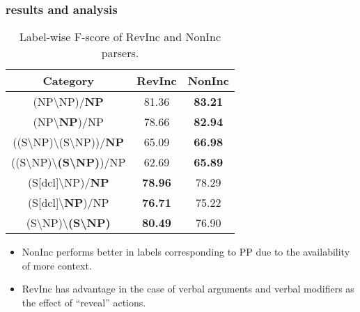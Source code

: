 \documentclass[10pt,usepdftitle=false,hyperref={unicode}]{beamer}
\begin{document}
\begin{frame}
    \frametitle{results and analysis}
    \begingroup
    \small
    \begin{center}
    \begin{table}
        \caption{Label-wise F-score of RevInc and NonInc parsers.}
            \begin{tabular}{ccc}
            \toprule
            Category                                                               & RevInc         & NonInc         \\
            \midrule
            (NP{\textbackslash}NP)/\textbf{NP}                                     & 81.36          & \textbf{83.21} \\
            (NP\textbackslash\textbf{NP})/NP                                       & 78.66          & \textbf{82.94} \\
            ((S{\textbackslash}NP)\textbackslash(S{\textbackslash}NP))/\textbf{NP} & 65.09          & \textbf{66.98} \\
            ((S{\textbackslash}NP)\textbackslash\textbf{(S{\textbackslash}NP)})/NP & 62.69          & \textbf{65.89} \\
            (S[dcl]{\textbackslash}NP)/\textbf{NP}                                 & \textbf{78.96} & 78.29          \\
            (S[dcl]\textbackslash\textbf{NP})/NP                                   & \textbf{76.71} & 75.22          \\
            (S{\textbackslash}NP)\textbackslash\textbf{(S{\textbackslash}NP)}      & \textbf{80.49} & 76.90          \\
            \bottomrule
            \end{tabular}
    \end{table}
    \end{center}
    \endgroup

    \smallskip

    \begin{itemize}
        \item NonInc performs better in labels corresponding to PP due to the availability of more context.
        \item RevInc has advantage in the case of verbal arguments and verbal modifiers as the effect of ``reveal'' actions.
    \end{itemize}
\end{frame}
\end{document}
